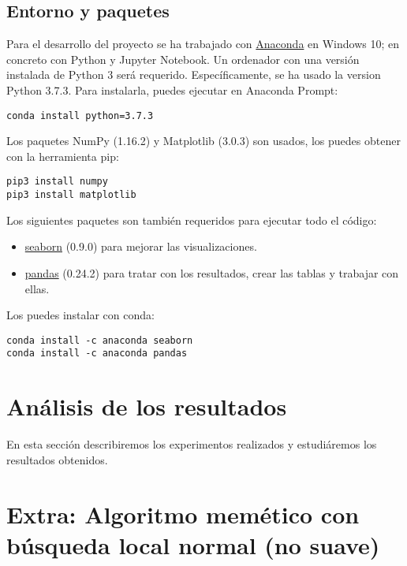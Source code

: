 \documentclass[11pt,a4paper]{article}
\begin{document}
	\subsection{Entorno y paquetes}
Para el desarrollo del proyecto se ha trabajado con \href{https://www.anaconda.com/download/}{Anaconda} en Windows 10;  en concreto con Python y Jupyter Notebook. Un ordenador con una versión instalada de Python 3 será requerido. Específicamente, se ha usado la version Python 3.7.3. Para instalarla, puedes ejecutar en Anaconda Prompt:
\begin{lstlisting}
conda install python=3.7.3
\end{lstlisting}
Los paquetes NumPy (1.16.2) y Matplotlib (3.0.3) son usados, los puedes obtener con la herramienta pip:
\begin{lstlisting}
pip3 install numpy
pip3 install matplotlib
\end{lstlisting}

Los siguientes paquetes son también requeridos para ejecutar todo el código:
\begin{itemize}
    \item \href{https://seaborn.pydata.org/}{seaborn} (0.9.0) para mejorar las visualizaciones.
    \item \href{https://pandas.pydata.org/}{pandas} (0.24.2) para tratar con los resultados, crear las tablas y trabajar con ellas.
\end{itemize}
Los puedes instalar con conda:
\begin{lstlisting}
conda install -c anaconda seaborn
conda install -c anaconda pandas
\end{lstlisting}
	
\clearpage
\section{Análisis de los resultados}
En esta sección describiremos los experimentos realizados y estudiáremos los resultados obtenidos. 
\clearpage

\section{Extra: Algoritmo memético con búsqueda local normal (no suave)}

\end{document}
